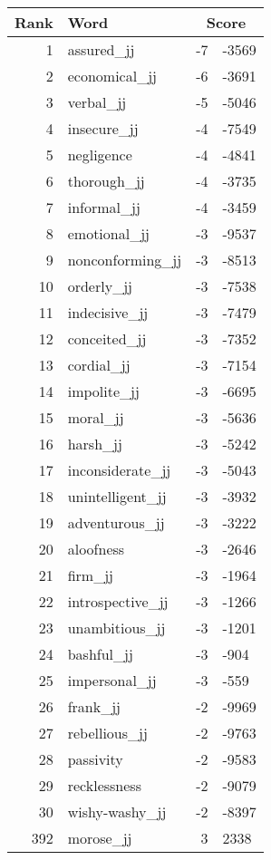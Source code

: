 \begin{longtable}[!htbp]{| rlr@{.}l |}
    \hline
    \textbf{Rank} & \textbf{Word} & \multicolumn{2}{c|}{\textbf{Score}} \\
    \hline
    \endhead
    1 & assured\_jj & -7 & -3569 \\
    2 & economical\_jj & -6 & -3691 \\
    3 & verbal\_jj & -5 & -5046 \\
    4 & insecure\_jj & -4 & -7549 \\
    5 & negligence & -4 & -4841 \\
    6 & thorough\_jj & -4 & -3735 \\
    7 & informal\_jj & -4 & -3459 \\
    8 & emotional\_jj & -3 & -9537 \\
    9 & nonconforming\_jj & -3 & -8513 \\
    10 & orderly\_jj & -3 & -7538 \\
    11 & indecisive\_jj & -3 & -7479 \\
    12 & conceited\_jj & -3 & -7352 \\
    13 & cordial\_jj & -3 & -7154 \\
    14 & impolite\_jj & -3 & -6695 \\
    15 & moral\_jj & -3 & -5636 \\
    16 & harsh\_jj & -3 & -5242 \\
    17 & inconsiderate\_jj & -3 & -5043 \\
    18 & unintelligent\_jj & -3 & -3932 \\
    19 & adventurous\_jj & -3 & -3222 \\
    20 & aloofness & -3 & -2646 \\
    21 & firm\_jj & -3 & -1964 \\
    22 & introspective\_jj & -3 & -1266 \\
    23 & unambitious\_jj & -3 & -1201 \\
    24 & bashful\_jj & -3 & -904 \\
    25 & impersonal\_jj & -3 & -559 \\
    26 & frank\_jj & -2 & -9969 \\
    27 & rebellious\_jj & -2 & -9763 \\
    28 & passivity & -2 & -9583 \\
    29 & recklessness & -2 & -9079 \\
    30 & wishy-washy\_jj & -2 & -8397 \\
    392 & morose\_jj & 3 & 2338 \\

\end{longtable}
